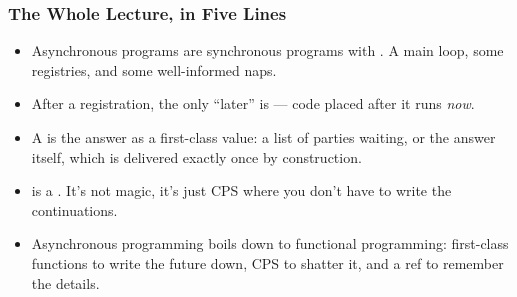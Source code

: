 \documentclass[aspectratio=169]{beamer}
\begin{document}
\begin{frame}[fragile]
  \frametitle{The Whole Lecture, in Five Lines}

  \begin{itemize}
    \item Asynchronous programs are synchronous programs with
      . A main loop, some registries, and
      some well-informed naps.
    \pause
    \item After a registration, the only ``later'' is  --- code placed after it runs \textit{now}.
    \pause
    \item A  is the answer as a first-class value: a list of
      parties waiting, or the answer itself, which is delivered exactly
      once by construction.
    \pause
    \item {} is a . It's not
      magic, it's just CPS where you don't have to write the
      continuations.
    \pause
    \item Asynchronous programming boils down to functional programming:
      first-class functions to write the future down, CPS to shatter it,
      and a ref to remember the details.
  \end{itemize}
\end{frame}






\end{document}

